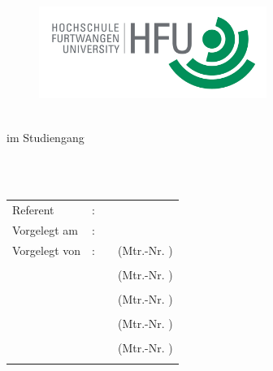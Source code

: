 \begin{titlepage}
\pagestyle{empty}

\begin{flushright}
\begin{figure}[ht]
\flushright
\includegraphics[height=3cm]{content/pictures/hfu.jpg}
\end{figure}
\end{flushright}

\begin{center}
{\fontsize{18}{22} \selectfont \docArtDerArbeit}\\[5mm]
{\fontsize{18}{22} \selectfont im Studiengang} \\[5mm]
{\fontsize{18}{22} \selectfont \docStudiengang}\\
\vspace{1cm}
\begin{onehalfspace}
{\fontsize{22}{26} \selectfont \textbf{\docTitle}}\\[5mm]
{\fontsize{18}{22} \selectfont \docUntertitle}


\end{onehalfspace}
\end{center}

\vfill
\begin{center}
\begin{tabular}{lcl}
Referent		&:& \docErsterReferent \\	
Vorgelegt am 	&:& \docAbgabedatum 	\\
Vorgelegt von 	&:& \docVornameA~\docNachnameA~(Mtr.-Nr. \docMatrikelnummerA)\\
				& & \docEmailA\\
				& & \docVornameB~\docNachnameB~(Mtr.-Nr. \docMatrikelnummerB)\\
				& & \docEmailB\\
				& & \docVornameC~\docNachnameC~(Mtr.-Nr. \docMatrikelnummerC)\\
				& & \docEmailC\\
				& & \docVornameD~\docNachnameD~(Mtr.-Nr. \docMatrikelnummerD)\\
				& & \docEmailD\\
				& & \docVornameE~\docNachnameE~(Mtr.-Nr. \docMatrikelnummerE)\\
				& & \docEmailE\\			
\end{tabular}
\end{center}
\end{titlepage}